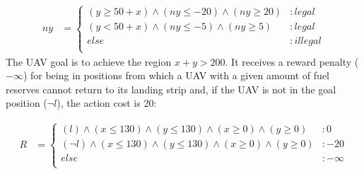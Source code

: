 {\footnotesize
\begin{align*}
ny & = \begin{cases}
(y \geq 50 + x) \wedge (ny \leq -20) \wedge (ny \geq 20) &:legal\\
(y < 50 + x) \wedge (ny \leq -5) \wedge (ny \geq 5) &:legal\\
else &: illegal\\
\end{cases}
\end{align*}}
The UAV goal is to achieve the region $x+y > 200$. It receives a reward penalty ($-\infty$) for being in positions  from which a UAV with a given amount of fuel reserves cannot return to its landing strip and, if the UAV is not in the goal position ($\neg l$), the action cost is 20:

{\footnotesize
\begin{align*}
R & = \begin{cases}
(l) \wedge (x \leq 130) \wedge (y \leq 130) \wedge (x \geq 0) \wedge (y \geq 0) &:0\\
(\neg l) \wedge (x \leq 130) \wedge (y \leq 130) \wedge (x \geq 0) \wedge (y \geq 0) &:-20\\
else &: -\infty\\
\end{cases}
\end{align*}}









